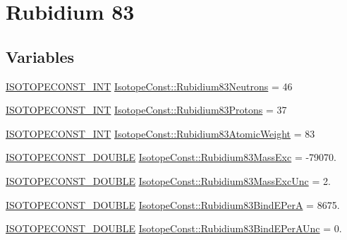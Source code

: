 \hypertarget{group___isotope_const-_rubidium-_rb83}{}\section{Rubidium 83}
\label{group___isotope_const-_rubidium-_rb83}
\subsection*{Variables}
\begin{DoxyCompactItemize}
\item 
\mbox{\hyperlink{group___isotope_const-_macros_ga5f18360b3e99483a35c32d789e62621c}{I\+S\+O\+T\+O\+P\+E\+C\+O\+N\+S\+T\+\_\+\+I\+NT}} \mbox{\hyperlink{group___isotope_const-_rubidium-_rb83_gaecc7e03f8e86e9533b88209e84bc3f21}{Isotope\+Const\+::\+Rubidium83\+Neutrons}} = 46
\item 
\mbox{\hyperlink{group___isotope_const-_macros_ga5f18360b3e99483a35c32d789e62621c}{I\+S\+O\+T\+O\+P\+E\+C\+O\+N\+S\+T\+\_\+\+I\+NT}} \mbox{\hyperlink{group___isotope_const-_rubidium-_rb83_gadcee2c0d63d41b13bbde02910e845194}{Isotope\+Const\+::\+Rubidium83\+Protons}} = 37
\item 
\mbox{\hyperlink{group___isotope_const-_macros_ga5f18360b3e99483a35c32d789e62621c}{I\+S\+O\+T\+O\+P\+E\+C\+O\+N\+S\+T\+\_\+\+I\+NT}} \mbox{\hyperlink{group___isotope_const-_rubidium-_rb83_gacedc15ef0f86ab22a29dbd4e709ac9b4}{Isotope\+Const\+::\+Rubidium83\+Atomic\+Weight}} = 83
\item 
\mbox{\hyperlink{group___isotope_const-_macros_ga8f45a7272ce02c0b4c65c44636ed719a}{I\+S\+O\+T\+O\+P\+E\+C\+O\+N\+S\+T\+\_\+\+D\+O\+U\+B\+LE}} \mbox{\hyperlink{group___isotope_const-_rubidium-_rb83_ga9f0510620276baceef0f239766fc2178}{Isotope\+Const\+::\+Rubidium83\+Mass\+Exc}} = -\/79070.
\item 
\mbox{\hyperlink{group___isotope_const-_macros_ga8f45a7272ce02c0b4c65c44636ed719a}{I\+S\+O\+T\+O\+P\+E\+C\+O\+N\+S\+T\+\_\+\+D\+O\+U\+B\+LE}} \mbox{\hyperlink{group___isotope_const-_rubidium-_rb83_ga005ff527edb9dc70e60240074f66a019}{Isotope\+Const\+::\+Rubidium83\+Mass\+Exc\+Unc}} = 2.
\item 
\mbox{\hyperlink{group___isotope_const-_macros_ga8f45a7272ce02c0b4c65c44636ed719a}{I\+S\+O\+T\+O\+P\+E\+C\+O\+N\+S\+T\+\_\+\+D\+O\+U\+B\+LE}} \mbox{\hyperlink{group___isotope_const-_rubidium-_rb83_gaca52cb6833a5fb45052945a79feafb4c}{Isotope\+Const\+::\+Rubidium83\+Bind\+E\+PerA}} = 8675.
\item 
\mbox{\hyperlink{group___isotope_const-_macros_ga8f45a7272ce02c0b4c65c44636ed719a}{I\+S\+O\+T\+O\+P\+E\+C\+O\+N\+S\+T\+\_\+\+D\+O\+U\+B\+LE}} \mbox{\hyperlink{group___isotope_const-_rubidium-_rb83_gaa6b7466080e952e186e709a3ae5f27ba}{Isotope\+Const\+::\+Rubidium83\+Bind\+E\+Per\+A\+Unc}} = 0.

\end{DoxyCompactItemize}

